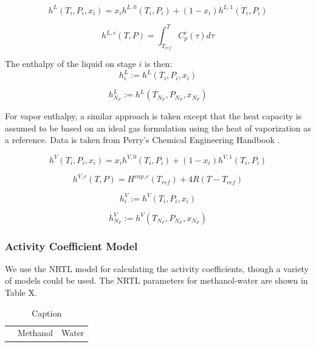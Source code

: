 \begin{equation}
    h^L(T_i, P_i, x_i) = x_ih^{L,0}(T_i,P_i) + (1-x_i)h^{L,1}(T_i,P_i)
\end{equation}

\begin{equation}
    h^{L,c}(T,P) = \int_{T_{ref}}^T C_p^c(\tau)d\tau 
\end{equation}

The enthalpy of the liquid on stage $i$ is then:
\begin{equation}
    h^L_i := h^L(T_i, P_i,x_i)
\end{equation}

\begin{equation}
    h^L_{N_F} := h^L(T_{N_F}, P_{N_F},x_{N_F})
\end{equation}

For vapor enthalpy,  a similar approach is taken except that the heat capacity is assumed to be based on an ideal gas formulation using the heat of vaporization as a reference. Data is taken from Perry’s Chemical Engineering Handbook \cite{Perrys2018}.


\begin{equation}
    h^V(T_i, P_i, x_i) = x_i h^{V,0}(T_i,P_i) + (1-x_i) h^{V,1}(T_i,P_i)
\end{equation}


\begin{equation}
    h^{V,c}(T,P) = H^{vap, c}(T_{ref}) + 4R(T-T_{ref})
\end{equation}


\begin{equation}
    h^V_i := h^V(T_i, P_i,x_i)
\end{equation}

\begin{equation}
    h^V_{N_F} := h^V(T_{N_F}, P_{N_F},x_{N_F})
\end{equation}


\subsubsection{Activity Coefficient Model}

We use the NRTL model for calculating the activity coefficients, though a variety of models could be used. The NRTL parameters for methanol-water are shown in Table X.

\begin{table}[]
    \centering
    \begin{tabular}{ccc}
         & Methanol & Water
    \end{tabular}
    \caption{Caption}
    \label{tab:my_label}
\end{table}

